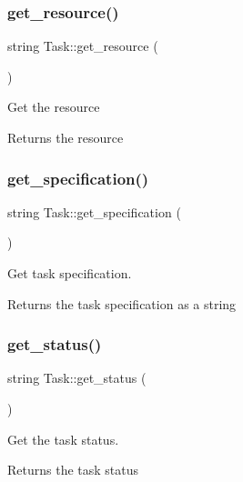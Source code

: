 \subsubsection{\texorpdfstring{get\+\_\+resource()}{get\_resource()}}
{\footnotesize\ttfamily string Task\+::get\+\_\+resource (\begin{DoxyParamCaption}{ }\end{DoxyParamCaption})}

Get the resource \begin{DoxyReturn}{Returns}
the resource 
\end{DoxyReturn}
\mbox{\label{classTask_a80fb64595e226c3501313e85290fcaf2}} 
\subsubsection{\texorpdfstring{get\+\_\+specification()}{get\_specification()}}
{\footnotesize\ttfamily string Task\+::get\+\_\+specification (\begin{DoxyParamCaption}{ }\end{DoxyParamCaption})}

Get task specification. \begin{DoxyReturn}{Returns}
the task specification as a string 
\end{DoxyReturn}
\mbox{\label{classTask_ae350debd8a8397e2923a164af6508010}} 
\subsubsection{\texorpdfstring{get\+\_\+status()}{get\_status()}}
{\footnotesize\ttfamily string Task\+::get\+\_\+status (\begin{DoxyParamCaption}{ }\end{DoxyParamCaption})}

Get the task status. \begin{DoxyReturn}{Returns}
the task status 
\end{DoxyReturn}
\mbox{\label{classTask_ac614b1c136949a316a3a18253df0121d}} 

